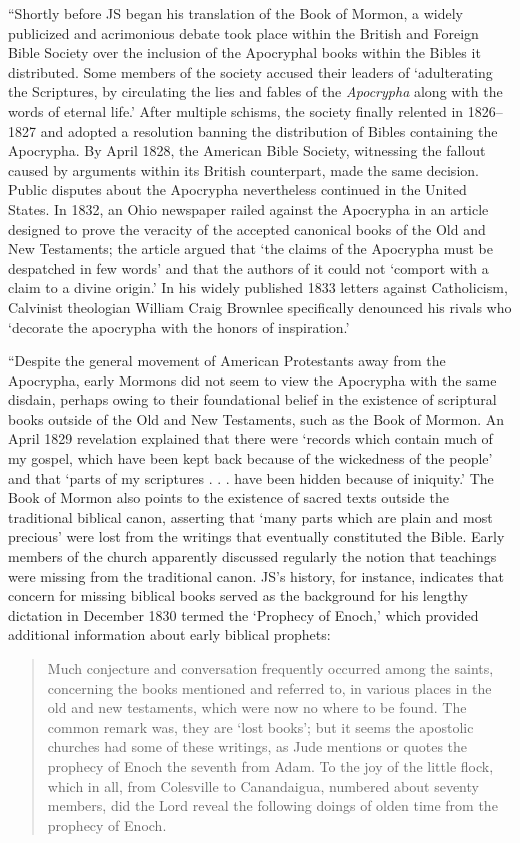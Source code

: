 			``Shortly before JS began his translation of the Book of Mormon, a widely publicized and acrimonious debate took place within the British and Foreign Bible Society over the inclusion of the Apocryphal books within the Bibles it distributed. Some members of the society accused their leaders of `adulterating the Scriptures, by circulating the lies and fables of the \textit{Apocrypha} along with the words of eternal life.' After multiple schisms, the society finally relented in 1826--1827 and adopted a resolution banning the distribution of Bibles containing the Apocrypha. By April 1828, the American Bible Society, witnessing the fallout caused by arguments within its British counterpart, made the same decision. Public disputes about the Apocrypha nevertheless continued in the United States. In 1832, an Ohio newspaper railed against the Apocrypha in an article designed to prove the veracity of the accepted canonical books of the Old and New Testaments; the article argued that `the claims of the Apocrypha must be despatched in few words' and that the authors of it could not `comport with a claim to a divine origin.' In his widely published 1833 letters against Catholicism, Calvinist theologian William Craig Brownlee specifically denounced his rivals who `decorate the apocrypha with the honors of inspiration.'
			
			``Despite the general movement of American Protestants away from the Apocrypha, early Mormons did not seem to view the Apocrypha with the same disdain, perhaps owing to their foundational belief in the existence of scriptural books outside of the Old and New Testaments, such as the Book of Mormon. An April 1829 revelation explained that there were `records which contain much of my gospel, which have been kept back because of the wickedness of the people' and that `parts of my scriptures . . . have been hidden because of iniquity.' The Book of Mormon also points to the existence of sacred texts outside the traditional biblical canon, asserting that `many parts which are plain and most precious' were lost from the writings that eventually constituted the Bible. Early members of the church apparently discussed regularly the notion that teachings were missing from the traditional canon. JS's history, for instance, indicates that concern for missing biblical books served as the background for his lengthy dictation in December 1830 termed the `Prophecy of Enoch,' which provided additional information about early biblical prophets:
			
			\begin{quote}
				Much conjecture and conversation frequently occurred among the saints, concerning the books mentioned and referred to, in various places in the old and new testaments, which were now no where to be found. The common remark was, they are `lost books'; but it seems the apostolic churches had some of these writings, as Jude mentions or quotes the prophecy of Enoch the seventh from Adam. To the joy of the little flock, which in all, from Colesville to Canandaigua, numbered about seventy members, did the Lord reveal the following doings of olden time from the prophecy of Enoch.
			\end{quote}
			
